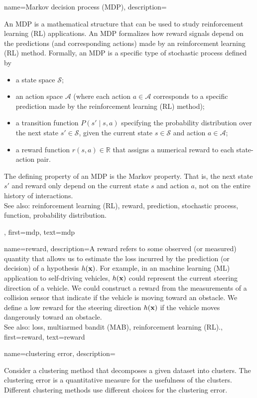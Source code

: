 {
{name={Markov decision process (MDP)},
	description={An MDP  is a mathematical structure that can 
    		be used to study reinforcement learning (RL) applications. An MDP formalizes how reward 
		signals depend on the predictions (and corresponding actions) made by an reinforcement learning (RL) 
		method. Formally, an MDP is a specific type of stochastic process defined by
		\begin{itemize}
    			\item a state space $\mathcal{S}$;
    			\item an action space $\mathcal{A}$ (where each action $a \in \mathcal{A}$ corresponds to a specific 
			prediction made by the reinforcement learning (RL) method);
    			\item a transition function $P\left(s' \mid s, a\right)$ specifying the probability distribution over the 
			next state $s' \in \mathcal{S}$, given the current state $s \in \mathcal{S}$ and action $a \in \mathcal{A}$;
    			\item a reward function $r(s, a) \in \mathbb{R}$ that assigns a numerical reward to each 
			state-action pair.
		\end{itemize}
		The defining property of an MDP is the Markov property. That is, the next state $s'$ and reward 
		only depend on the current state $s$ and action $a$, not on the entire history of interactions. 
		\\
		See also: reinforcement learning (RL), reward, prediction, stochastic process, function, probability distribution.},
 	first={mdp},
 	text={mdp} 
 }
 

{name={reward}, 
	description={A reward refers to some observed 
		(or measured) quantity that allows us to estimate the loss incurred by the prediction 
		(or decision) of a hypothesis $h({\bf x})$. For example, in an 
		machine learning (ML) application to self-driving vehicles, $h({\bf x})$ could represent 
		the current steering direction of a vehicle. We could construct a reward from the 
		measurements of a collision sensor that indicate if the vehicle is moving toward 
		an obstacle. We define a low reward for the steering direction 
		$h({\bf x})$ if the vehicle moves dangerously toward an obstacle.
			\\
		See also: loss, multiarmed bandit (MAB), reinforcement learning (RL).},
	first={reward}, 
	text={reward}
} 

{name={clustering error}, 
	description={Consider a clustering method that decomposes 
	a given dataset into clusters. The clustering error is a quantitative 
	measure for the usefulness of the clusters. Different clustering methods 
	use different choices for the clustering error. 
	\begin{figure}
\centering
\begin{tikzpicture}[scale=1]


\end{tikzpicture}
\end{figure}}}}
